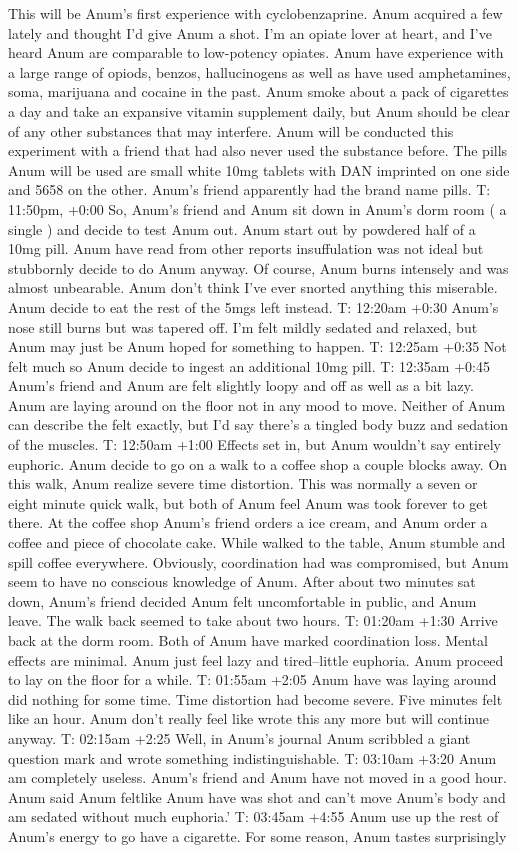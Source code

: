 \documentclass[12pt]{book}
\begin{document}
This will be Anum's first experience with cyclobenzaprine. Anum acquired a few lately and thought I'd give Anum a shot. I'm an opiate lover at heart, and I've heard Anum are comparable to low-potency opiates. Anum have experience with a large range of opiods, benzos, hallucinogens as well as have used amphetamines, soma, marijuana and cocaine in the past. Anum smoke about a pack of cigarettes a day and take an expansive vitamin supplement daily, but Anum should be clear of any other substances that may interfere. Anum will be conducted this experiment with a friend that had also never used the substance before. The pills Anum will be used are small white 10mg tablets with DAN imprinted on one side and 5658 on the other. Anum's friend apparently had the brand name pills. T: 11:50pm, +0:00 So, Anum's friend and Anum sit down in Anum's dorm room ( a single ) and decide to test Anum out. Anum start out by powdered half of a 10mg pill. Anum have read from other reports insuffulation was not ideal but stubbornly decide to do Anum anyway. Of course, Anum burns intensely and was almost unbearable. Anum don't think I've ever snorted anything this miserable. Anum decide to eat the rest of the 5mgs left instead. T: 12:20am +0:30 Anum's nose still burns but was tapered off. I'm felt mildly sedated and relaxed, but Anum may just be Anum hoped for something to happen. T: 12:25am +0:35 Not felt much so Anum decide to ingest an additional 10mg pill. T: 12:35am +0:45 Anum's friend and Anum are felt slightly loopy and off as well as a bit lazy. Anum are laying around on the floor not in any mood to move. Neither of Anum can describe the felt exactly, but I'd say there's a tingled body buzz and sedation of the muscles. T: 12:50am +1:00 Effects set in, but Anum wouldn't say entirely euphoric. Anum decide to go on a walk to a coffee shop a couple blocks away. On this walk, Anum realize severe time distortion. This was normally a seven or eight minute quick walk, but both of Anum feel Anum was took forever to get there. At the coffee shop Anum's friend orders a ice cream, and Anum order a coffee and piece of chocolate cake. While walked to the table, Anum stumble and spill coffee everywhere. Obviously, coordination had was compromised, but Anum seem to have no conscious knowledge of Anum. After about two minutes sat down, Anum's friend decided Anum felt uncomfortable in public, and Anum leave. The walk back seemed to take about two hours. T: 01:20am +1:30 Arrive back at the dorm room. Both of Anum have marked coordination loss. Mental effects are minimal. Anum just feel lazy and tired--little euphoria. Anum proceed to lay on the floor for a while. T: 01:55am +2:05 Anum have was laying around did nothing for some time. Time distortion had become severe. Five minutes felt like an hour. Anum don't really feel like wrote this any more but will continue anyway. T: 02:15am +2:25 Well, in Anum's journal Anum scribbled a giant question mark and wrote something indistinguishable. T: 03:10am +3:20 Anum am completely useless. Anum's friend and Anum have not moved in a good hour. Anum said Anum feltlike Anum have was shot and can't move Anum's body and am sedated without much euphoria.' T: 03:45am +4:55 Anum use up the rest of Anum's energy to go have a cigarette. For some reason, Anum tastes surprisingly 
\end{document}

